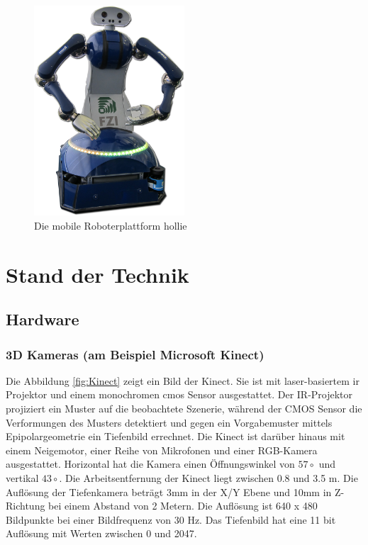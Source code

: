 \begin{figure}[h]
	\center
	\includegraphics[width=0.5\textwidth]{graphics/hollie}
	\caption{\label{fig:hollie} Die mobile Roboterplattform \gls{hollie}}
\end{figure}



\section{Stand der Technik}
\label{stand_der_technik_sec}
\authorsection{\editorabel}

\subsection{Hardware}

\subsubsection{3D Kameras (am Beispiel Microsoft Kinect)}
Die Abbildung \ref{fig:Kinect} zeigt ein Bild der Kinect.
Sie ist mit laser-basiertem \gls{ir} Projektor und einem monochromen \gls{cmos} Sensor ausgestattet.
Der IR-Projektor projiziert ein Muster auf die beobachtete Szenerie, während der CMOS Sensor die Verformungen des Musters detektiert und gegen ein Vorgabemuster mittels Epipolargeometrie ein Tiefenbild errechnet.
Die Kinect ist darüber hinaus mit einem Neigemotor, einer Reihe von Mikrofonen und einer RGB-Kamera ausgestattet.
Horizontal hat die Kamera einen Öffnungswinkel von $57\circ$ und vertikal $43\circ$.
Die Arbeitsentfernung der Kinect liegt zwischen 0.8 und 3.5 m.
Die Auflösung der Tiefenkamera beträgt 3mm in der X/Y Ebene und 10mm in Z-Richtung bei einem Abstand von 2 Metern.
Die Auflösung ist 640 x 480 Bildpunkte bei einer Bildfrequenz von 30 Hz.
Das Tiefenbild hat eine 11 bit Auflösung mit Werten zwischen 0 und 2047.

